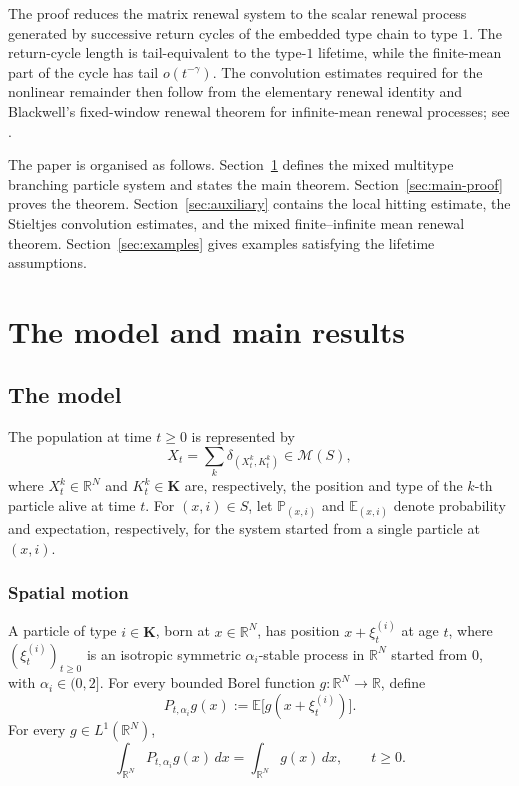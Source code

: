 \documentclass[reqno,final,11pt]{amsart}
\newcommand{\R}{\mathbb R}
\newcommand{\E}{\mathbb E}
\newcommand{\Pbb}{\mathbb P}
\newcommand{\Kk}{\mathbf K}
\newcommand{\cM}{\mathcal M}
\theoremstyle{plain}
\theoremstyle{definition}
\theoremstyle{remark}
\numberwithin{equation}{section}
\begin{document}
The proof reduces the matrix renewal system to the scalar renewal process generated by successive return cycles of the embedded type chain to type \(1\). The return-cycle length is tail-equivalent to the type-\(1\) lifetime, while the finite-mean part of the cycle has tail \(o(t^{-\gamma})\). The convolution estimates required for the nonlinear remainder then follow from the elementary renewal identity and Blackwell's fixed-window renewal theorem for infinite-mean renewal processes; see \cite[Eq.~(1.1), p.~88]{Thorisson1987}.

The paper is organised as follows. Section~\ref{sec:model} defines the mixed multitype branching particle system and states the main theorem. Section~\ref{sec:main-proof} proves the theorem. Section~\ref{sec:auxiliary} contains the local hitting estimate, the Stieltjes convolution estimates, and the mixed finite--infinite mean renewal theorem. Section~\ref{sec:examples} gives examples satisfying the lifetime assumptions.


\section{The model and main results}\label{sec:model}


\subsection{The model}

The population at time \(t\ge0\) is represented by
\[
  X_t=\sum_k\delta_{(X_t^k,K_t^k)}\in\cM(S),
\]
where \(X_t^k\in\R^N\) and \(K_t^k\in\Kk\) are, respectively, the position and type of the \(k\)-th particle alive at time \(t\). For \((x,i)\in S\), let \(\Pbb_{(x,i)}\) and \(\E_{(x,i)}\) denote probability and expectation, respectively, for the system started from a single particle at \((x,i)\).

\subsubsection{Spatial motion}

A particle of type \(i\in\Kk\), born at \(x\in\R^N\), has position \(x+\xi_t^{(i)}\) at age \(t\), where \((\xi_t^{(i)})_{t\ge0}\) is an isotropic symmetric \(\alpha_i\)-stable process in \(\R^N\) started from \(0\), with \(\alpha_i\in(0,2]\). For every bounded Borel function \(g:\R^N\to\R\), define
\[
  P_{t,\alpha_i}g(x):=\E\bigl[g(x+\xi_t^{(i)})\bigr].
\]
For every \(g\in L^1(\R^N)\),
\[
  \int_{\R^N}P_{t,\alpha_i}g(x)\,dx
  =
  \int_{\R^N}g(x)\,dx,
  \qquad t\ge0.
\]
\end{document}
